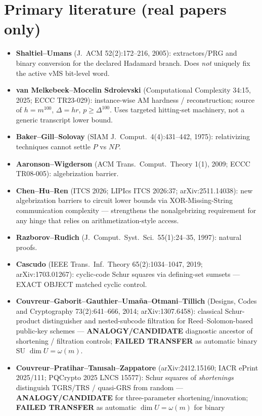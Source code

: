 \documentclass[11pt]{article}
\begin{document}
\section*{Primary literature (real papers only)}
\begin{itemize}
\item \textbf{Shaltiel--Umans} (J.~ACM 52(2):172--216, 2005): extractors/PRG and binary
conversion for the declared Hadamard branch. Does \emph{not} uniquely fix the active
vMS bit-level word.
\item \textbf{van Melkebeek--Mocelin Sdroievski} (Computational Complexity 34:15, 2025;
ECCC TR23-029): instance-wise AM hardness / reconstruction; source of $h=m^{100}$,
$\Delta=hr$, $p\ge\Delta^{100}$. Uses targeted hitting-set machinery, not a generic
transcript lower bound.
\item \textbf{Baker--Gill--Solovay} (SIAM J.\ Comput.\ 4(4):431--442, 1975): relativizing
techniques cannot settle $P$ vs $NP$.
\item \textbf{Aaronson--Wigderson} (ACM Trans.\ Comput.\ Theory 1(1), 2009; ECCC TR08-005):
algebrization barrier.
\item \textbf{Chen--Hu--Ren} (ITCS 2026; LIPIcs ITCS 2026:37; arXiv:2511.14038): new
algebrization barriers to circuit lower bounds via XOR-Missing-String communication
complexity --- strengthens the nonalgebrizing requirement for any hinge that relies on
arithmetization-style access.
\item \textbf{Razborov--Rudich} (J.\ Comput.\ Syst.\ Sci.\ 55(1):24--35, 1997): natural proofs.
\item \textbf{Cascudo} (IEEE Trans.\ Inf.\ Theory 65(2):1034--1047, 2019; arXiv:1703.01267):
cyclic-code Schur squares via defining-set sumsets --- EXACT OBJECT matched cyclic control.
\item \textbf{Couvreur--Gaborit--Gauthier--Uma\~na--Otmani--Tillich}
(Designs, Codes and Cryptography 73(2):641--666, 2014; arXiv:1307.6458): classical
Schur-product distinguisher and nested-subcode filtration for Reed--Solomon-based
public-key schemes --- \textbf{ANALOGY/CANDIDATE} diagnostic ancestor of shortening /
filtration controls; \textbf{FAILED TRANSFER} as automatic binary SU $\dim U=\omega(m)$.
\item \textbf{Couvreur--Pratihar--Tan{\i}sal{\i}--Zappatore} (arXiv:2412.15160; IACR ePrint
2025/111; PQCrypto 2025 LNCS 15577): Schur squares of \emph{shortenings} distinguish
TGRS/TRS / quasi-GRS from random --- \textbf{ANALOGY/CANDIDATE} for three-parameter
shortening/innovation; \textbf{FAILED TRANSFER} as automatic $\dim U=\omega(m)$ for binary

\end{itemize}
\end{document}
